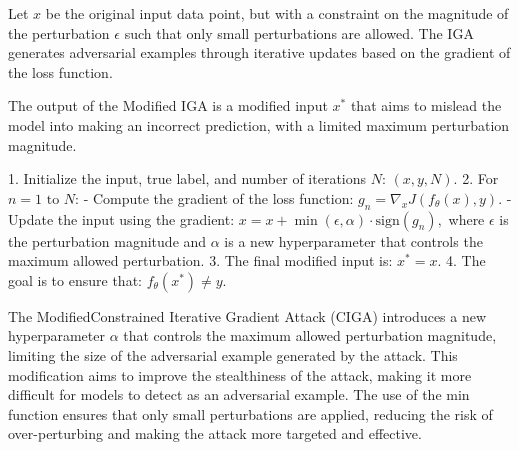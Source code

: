 Let \( x \) be the original input data point, but with a constraint on the magnitude of the perturbation \(\epsilon\) such that only small perturbations are allowed. The IGA generates adversarial examples through iterative updates based on the gradient of the loss function.

The output of the Modified IGA is a modified input \( x^* \) that aims to mislead the model into making an incorrect prediction, with a limited maximum perturbation magnitude.

1. Initialize the input, true label, and number of iterations \( N \):
   $
   (x, y, N).
   $
2. For \( n = 1 \text{ to } N \):
   - Compute the gradient of the loss function:
   $
   g_n = \nabla_x J(f_{\theta}(x), y).
   $
   - Update the input using the gradient:
   $
   x = x + \min(\epsilon, \alpha) \cdot \text{sign}(g_n),
   $
   where \( \epsilon \) is the perturbation magnitude and \( \alpha \) is a new hyperparameter that controls the maximum allowed perturbation.
3. The final modified input is:
   $
   x^* = x.
   $
4. The goal is to ensure that:
   $
   f_{\theta}(x^*) \neq y.
   $

The ModifiedConstrained Iterative Gradient Attack (CIGA) introduces a new hyperparameter \( \alpha \) that controls the maximum allowed perturbation magnitude, limiting the size of the adversarial example generated by the attack. This modification aims to improve the stealthiness of the attack, making it more difficult for models to detect as an adversarial example. The use of the min function ensures that only small perturbations are applied, reducing the risk of over-perturbing and making the attack more targeted and effective.